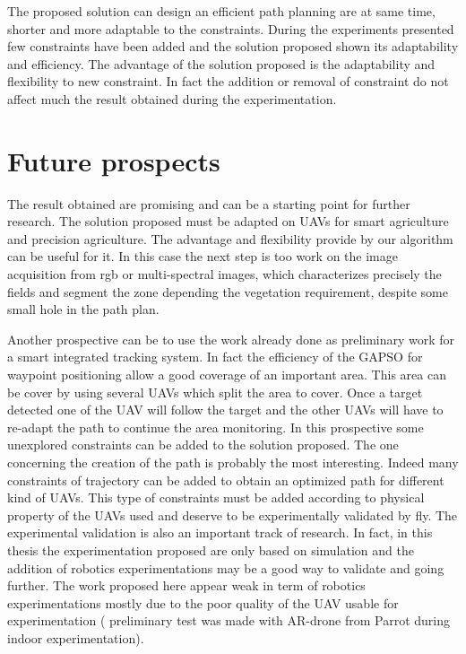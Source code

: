The proposed solution can design an efficient path planning are at same time, shorter and more adaptable to the constraints. During the experiments presented few constraints have been added and the solution proposed shown its adaptability and efficiency. 
The advantage of the solution proposed is the adaptability and flexibility to new constraint. In fact the addition or removal of constraint do not affect much the result obtained during the experimentation.

\section{Future prospects}
The result obtained are promising and can be a starting point for further research. 
The solution proposed must be adapted on UAVs for smart agriculture and precision agriculture. The advantage and flexibility provide by our algorithm can be useful for it. In this case the next step is too work on the image acquisition from rgb or multi-spectral images, which characterizes precisely the fields and segment the zone depending the vegetation requirement, despite some small hole in the path plan.

Another prospective can be to use the work already done as preliminary work for a smart integrated tracking system. In	fact the efficiency of the GAPSO  for waypoint positioning allow a good coverage of an important area. This area  can be cover by using several UAVs which split the area to cover. Once a target detected one of the UAV will follow  the target and the other UAVs will have to re-adapt the path to continue the area monitoring. In this prospective some unexplored constraints can be added to the solution proposed. 
The one concerning the creation of the path is probably the most interesting.  Indeed many constraints of trajectory can be added to obtain an optimized path for different kind of UAVs. This type of constraints must be added according to physical property of the UAVs used and deserve to be experimentally validated by fly. 
The experimental validation is also an important track of research. In fact, in this thesis the experimentation proposed are only based on simulation and the addition of robotics experimentations may be a good way to validate  and going further.  The work proposed here appear weak in term of robotics experimentations mostly due to the poor quality of the UAV usable for experimentation ( preliminary test was made with AR-drone from Parrot during indoor experimentation).

